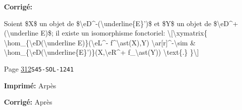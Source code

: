 \begin{description}
\par\noindent\textbf{Corrigé:} {\footnotesize\ttfamily\raggedright Soient \$X\$ un objet de \$\textbackslash{}\allowbreak{}eD\textasciicircum{}\allowbreak{}-\allowbreak{}(\allowbreak{}\textbackslash{}\allowbreak{}underline\{\allowbreak{}E\}\allowbreak{}')\allowbreak{}\$ et \$Y\$ un objet de  \$\textbackslash{}\allowbreak{}eD\textasciicircum{}\allowbreak{}+\allowbreak{}(\allowbreak{}\textbackslash{}\allowbreak{}underline E)\allowbreak{}\$; il existe un isomorphisme fonctoriel:  \textbackslash{}\allowbreak{}[\allowbreak{}\textbackslash{}\allowbreak{}xymatrix\{\allowbreak{}   \textbackslash{}\allowbreak{}hom\_\allowbreak{}\{\allowbreak{}\textbackslash{}\allowbreak{}eD(\allowbreak{}\textbackslash{}\allowbreak{}underline E)\allowbreak{}\}\allowbreak{}(\allowbreak{}\textbackslash{}\allowbreak{}eL\textasciicircum{}\allowbreak{}-\allowbreak{} f\textasciicircum{}\allowbreak{}\textbackslash{}\allowbreak{}ast(\allowbreak{}X)\allowbreak{},\allowbreak{}Y)\allowbreak{} \textbackslash{}\allowbreak{}ar[\allowbreak{}r]\allowbreak{}\textasciicircum{}\allowbreak{}-\allowbreak{}\textbackslash{}\allowbreak{}sim      \& \textbackslash{}\allowbreak{}hom\_\allowbreak{}\{\allowbreak{}\textbackslash{}\allowbreak{}eD(\allowbreak{}\textbackslash{}\allowbreak{}underline\{\allowbreak{}E\}\allowbreak{}')\allowbreak{}\}\allowbreak{}(\allowbreak{}X,\allowbreak{}\textbackslash{}\allowbreak{}eR\textasciicircum{}\allowbreak{}+\allowbreak{} f\_\allowbreak{}\textbackslash{}\allowbreak{}ast(\allowbreak{}Y)\allowbreak{})\allowbreak{} \textbackslash{}\allowbreak{}text\{\allowbreak{}.\}\allowbreak{} \}\allowbreak{}\textbackslash{}\allowbreak{}]\allowbreak{}\par}
\smallskip
\item[\hypertarget{apparatus:FR-0312}{312}] Page \hyperlink{printpage:fr:312}{312}\quad\texttt{S45-SOL-1241}
\par\noindent\textbf{Imprimé:} Arpès
\par\noindent\textbf{Corrigé:} Après
\smallskip
\end{description}
\endgroup
\fi
